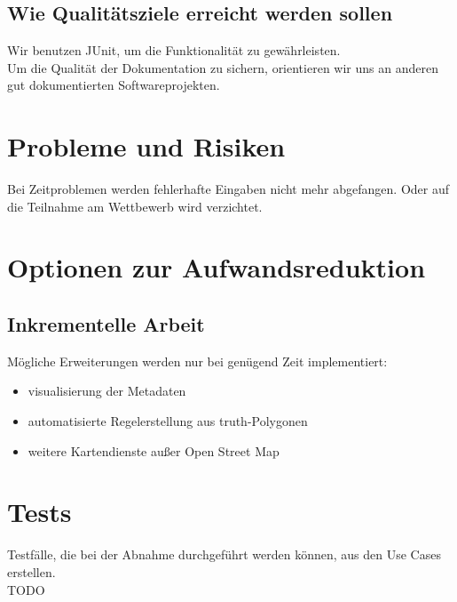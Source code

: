 \subsection{Wie Qualitätsziele erreicht werden sollen}
Wir benutzen JUnit, um die Funktionalität zu gewährleisten.\\
Um die Qualität der Dokumentation zu sichern, orientieren wir uns an anderen gut dokumentierten Softwareprojekten.
\section{Probleme und Risiken}
Bei Zeitproblemen werden fehlerhafte Eingaben nicht mehr abgefangen. Oder auf die Teilnahme am Wettbewerb wird verzichtet.
\section{Optionen zur Aufwandsreduktion}
\subsection{Inkrementelle Arbeit}
Mögliche Erweiterungen werden nur bei genügend Zeit implementiert:
\begin{itemize}
 \item visualisierung der Metadaten
 \item automatisierte Regelerstellung aus truth-Polygonen
 \item weitere Kartendienste außer Open Street Map
\end{itemize}

\section{Tests}
Testfälle, die bei der Abnahme durchgeführt werden können, aus den Use Cases erstellen.\\
TODO
